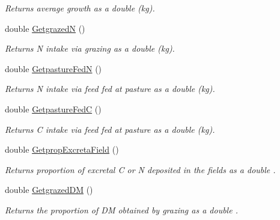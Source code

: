 \begin{DoxyCompactItemize}
\begin{DoxyCompactList}\small\item\em Returns average growth as a double (kg). \end{DoxyCompactList}\item 
\mbox{\label{classlivestock_a528e48c445b8b6473e8ac4d72d9a498e}} 
double \mbox{\hyperlink{classlivestock_a528e48c445b8b6473e8ac4d72d9a498e}{GetgrazedN}} ()
\begin{DoxyCompactList}\small\item\em Returns N intake via grazing as a double (kg). \end{DoxyCompactList}\item 
\mbox{\label{classlivestock_a2fb8301f7beb23e3240f42e773376044}} 
double \mbox{\hyperlink{classlivestock_a2fb8301f7beb23e3240f42e773376044}{Getpasture\+FedN}} ()
\begin{DoxyCompactList}\small\item\em Returns N intake via feed fed at pasture as a double (kg). \end{DoxyCompactList}\item 
\mbox{\label{classlivestock_a88259956eaef4d65f5ae738d12101c51}} 
double \mbox{\hyperlink{classlivestock_a88259956eaef4d65f5ae738d12101c51}{Getpasture\+FedC}} ()
\begin{DoxyCompactList}\small\item\em Returns C intake via feed fed at pasture as a double (kg). \end{DoxyCompactList}\item 
\mbox{\label{classlivestock_a649ac223461d7deda6829ca476f3b16a}} 
double \mbox{\hyperlink{classlivestock_a649ac223461d7deda6829ca476f3b16a}{Getprop\+Excreta\+Field}} ()
\begin{DoxyCompactList}\small\item\em Returns proportion of excretal C or N deposited in the fields as a double . \end{DoxyCompactList}\item 
\mbox{\label{classlivestock_a1bd87a98d88bb40dca656880ea0e17e0}} 
double \mbox{\hyperlink{classlivestock_a1bd87a98d88bb40dca656880ea0e17e0}{Getgrazed\+DM}} ()
\begin{DoxyCompactList}\small\item\em Returns the proportion of DM obtained by grazing as a double . \end{DoxyCompactList}\item 

\end{DoxyCompactItemize}

